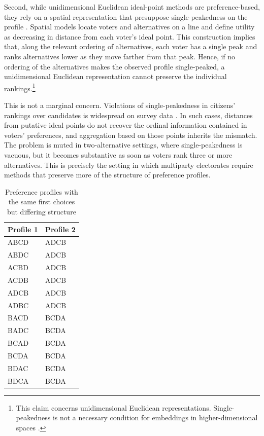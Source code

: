 \documentclass[12pt]{article}
\begin{document}
Second, while unidimensional Euclidean ideal-point methods are preference-based, they rely on a spatial representation that presuppose single-peakedness on the  profile \parencite{elkind2022preference, fiorina08_polit_polar_americ_public}. Spatial models locate voters and alternatives on a line and define utility as decreasing in distance from each voter's ideal point. This construction implies that, along the relevant ordering of alternatives, each voter has a single peak and ranks alternatives lower as they move farther from that peak. Hence, if no ordering of the alternatives makes the observed profile single-peaked, a unidimensional Euclidean representation cannot preserve the individual rankings.\footnote{This claim concerns unidimensional Euclidean representations. Single-peakedness is not a necessary condition for embeddings in higher-dimensional spaces \parencite{elkind2022preference}.}

This is not a marginal concern. Violations of single-peakedness in citizens' rankings over candidates is widespread on survey data \parencite{regenwetter2006behavioral, feld1988ideological, ballester10_charac_singl_peaked_domain}. In such cases, distances from putative ideal points do not recover the ordinal information contained in voters' preferences, and aggregation based on those points inherits the mismatch. The problem is muted in two-alternative settings, where single-peakedness is vacuous, but it becomes substantive as soon as voters rank three or more alternatives. This is precisely the setting in which multiparty electorates require methods that preserve more of the structure of preference profiles.

\begin{table}[htbp]
\centering
\caption{Preference profiles with the same first choices but differing structure}
\label{tab:profile-matrix}
\begin{tabular}{ll}
\toprule
\textbf{Profile 1} & \textbf{Profile 2} \\
\midrule
ABCD & ADCB \\
ABDC & ADCB \\
ACBD & ADCB \\
ACDB & ADCB \\
ADCB & ADCB \\
ADBC & ADCB \\
BACD & BCDA \\
BADC & BCDA \\
BCAD & BCDA \\
BCDA & BCDA \\
BDAC & BCDA \\
BDCA & BCDA \\
\bottomrule
\end{tabular}
\end{table}
\end{document}
